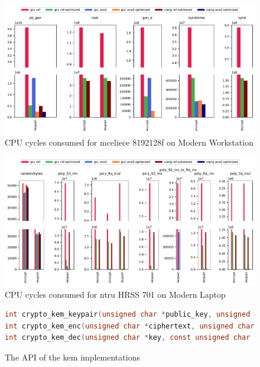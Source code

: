 





\begin{figure}
    \centering
    \includegraphics[width=\textwidth]{chapters/results/micro/mceliece_8192128f_Modern Workstation_cpu-cycles.pdf}
    \caption{CPU cycles consumed for \gls{mceliece} 8192128f on Modern Workstation}
    \label{figure:results:micro:mceliece-8192128f-modern-workstation}
\end{figure}

\begin{figure}
    \centering
    \includegraphics[width=\textwidth]{chapters/results/micro/ntru_hrss701_Modern Laptop_cpu-cycles.pdf}
    \caption{CPU cycles consumed for \gls{ntru} HRSS 701 on Modern Laptop}
    \label{figure:results:micro:ntru-hrss701-modern-laptop}
\end{figure}

\begin{figure}
    \centering
    \begin{lstlisting}[language=C]
int crypto_kem_keypair(unsigned char *public_key, unsigned char *private_key);
int crypto_kem_enc(unsigned char *ciphertext, unsigned char *key, const unsigned char *public_key);
int crypto_kem_dec(unsigned char *key, const unsigned char *ciphertext, const unsigned char *private_key);
    \end{lstlisting}
    \caption{The API of the \gls{kem} implementations}
    \label{figure:result:memory:kem-api}
\end{figure}

